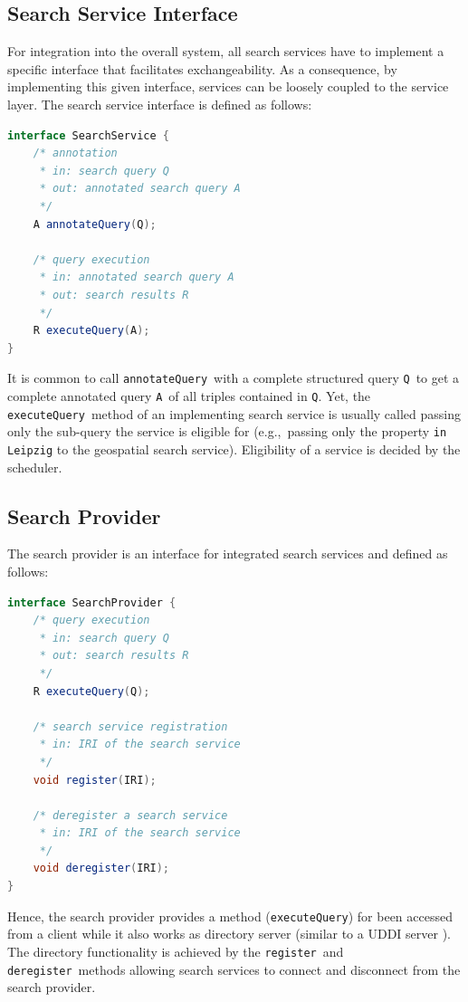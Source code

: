 \documentclass{acm_proc_article-sp}
\newcommand{\code}[1]{\texttt{#1}}
\newcommand{\eg}{e.g.,~}
\begin{document}
\subsection{Search Service Interface}
For integration into the overall system, all search services have to implement a specific interface that facilitates exchangeability.
As a consequence, by implementing this given interface, services can be loosely coupled to the service layer.
The search service interface is defined as follows:
\begin{lstlisting}[language=Java]
interface SearchService {
    /* annotation
     * in: search query Q
     * out: annotated search query A
     */ 
    A annotateQuery(Q);
    
    /* query execution 
     * in: annotated search query A
     * out: search results R
     */
    R executeQuery(A);
}
\end{lstlisting}
It is common to call \code{annotateQuery}\ with a complete structured query \code{Q}\ to get a complete annotated query \code{A}\ of all triples contained in \code{Q}.
Yet, the \code{executeQuery}\ method of an implementing search service is usually called passing only the sub-query the service is eligible for (\eg passing only the property \texttt{in Leipzig} to the geospatial search service).
Eligibility of a service is decided by the scheduler.

\subsection{Search Provider}
The search provider is an interface for integrated search services and defined as follows:
\begin{lstlisting}[language=Java]
interface SearchProvider {
    /* query execution 
     * in: search query Q
     * out: search results R
     */
    R executeQuery(Q);
    
    /* search service registration 
     * in: IRI of the search service
     */
    void register(IRI);
    
    /* deregister a search service  
     * in: IRI of the search service
     */
    void deregister(IRI);
}
\end{lstlisting}
Hence, the search provider provides a method (\code{executeQuery}) for been accessed from a client while it also works as directory server (similar to a UDDI server \cite{UDDI}).
The directory functionality is achieved by the \code{register}\ and \code{deregister}\ methods allowing search services to connect and disconnect from the search provider.
\end{document}
